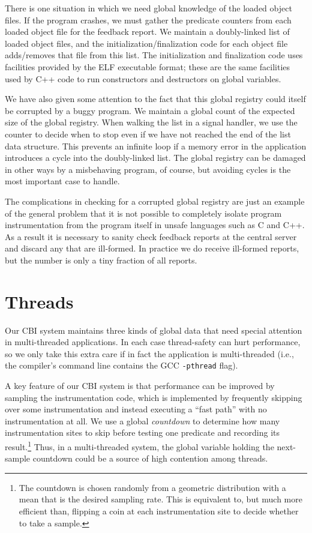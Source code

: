 \documentclass[10pt,twocolumn]{article}
\begin{document}
There is one situation in which we need global knowledge of the loaded
object files.  If the program crashes, we must gather
the predicate counters from each loaded object file for the feedback report.
We maintain a doubly-linked list of loaded object files, and the
initialization/finalization code for each object file adds/removes that
file from this list. The initialization and finalization code uses
facilities provided by the ELF executable format; these are the same
facilities used by C++ code to run constructors and destructors on
global variables.

We have also given some attention to the fact that this global
registry could itself be corrupted by a buggy program.  We maintain a
global count of the expected size of the global registry.  When
walking the list in a signal handler, we use the counter to decide
when to stop even if we have not reached the end of the list data
structure.  This prevents an infinite loop if a memory error in the
application introduces a cycle into the doubly-linked list.  The
global registry can be damaged in other ways by a misbehaving program,
of course, but avoiding cycles is the most important case to handle.

The complications in checking for a corrupted global registry are just
an example of the general problem that it is not possible to
completely isolate program instrumentation from the program itself in
unsafe languages such as C and C++.  As a result it is necessary to
sanity check feedback reports at the central server and discard any
that are ill-formed.  In practice we do receive ill-formed reports,
but the number is only a tiny fraction of all reports.

\section{Threads}

Our CBI system maintains three kinds of global data that 
need special attention in multi-threaded
applications.  In each case thread-safety can hurt performance, 
so we only take this extra care if in fact the application is multi-threaded
(i.e., the compiler's command line contains the GCC \texttt{-pthread} flag).

A key feature of our CBI system is that performance can be improved by
sampling the instrumentation code, which is implemented by frequently
skipping over some instrumentation and instead executing a ``fast
path'' with no instrumentation at all.  We use a global \emph{countdown}
to determine how many instrumentation sites to skip before
testing one predicate and recording its result.\footnote{The countdown
is chosen randomly from a geometric distribution with a mean that is
the desired sampling rate.  This is equivalent to, but much more
efficient than, flipping a coin at each instrumentation site to decide
whether to take a sample.}  Thus, in a multi-threaded system, the
global variable holding the next-sample countdown could be a source of
high contention among threads.
\end{document}
